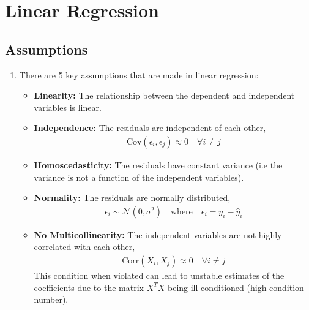 \documentclass[letterpaper, 11pt]{article}
\newcommand{\normal}[2]{\mathcal{N}\left(#1,#2\right)}
\newcommand{\1}{\mathds{1}}	%
\theoremstyle{definition}
\begin{document}


\section{Linear Regression}
\subsection{Assumptions}
\begin{enumerate}
    \item There are 5 key assumptions that are made in linear regression:
    \begin{itemize}
        \item \textbf{Linearity:} The relationship between the dependent and independent variables is linear.
        \item \textbf{Independence:} The residuals are independent of each other,
        \begin{align}
            \text{Cov}(\epsilon_i, \epsilon_j) \approx 0 \quad \forall i \neq j
        \end{align}
        \item \textbf{Homoscedasticity:} The residuals have constant variance (i.e the variance is not a function of the independent variables).
        \item \textbf{Normality:} The residuals are normally distributed,
        \begin{align}
            \epsilon_i \sim \normal{0}{\sigma^2} \quad \text{where} \quad \epsilon_i = y_i - \hat{y}_i
        \end{align}
        \item \textbf{No Multicollinearity:} The independent variables are not highly correlated with each other,
        \begin{align}
            \text{Corr}(X_i, X_j) \approx 0 \quad \forall i \neq j
        \end{align}
        This condition when violated can lead to unstable estimates of the coefficients due to 
        the matrix $X^T X$ being ill-conditioned (high condition number).
    \end{itemize}
\end{enumerate}
\end{document}
